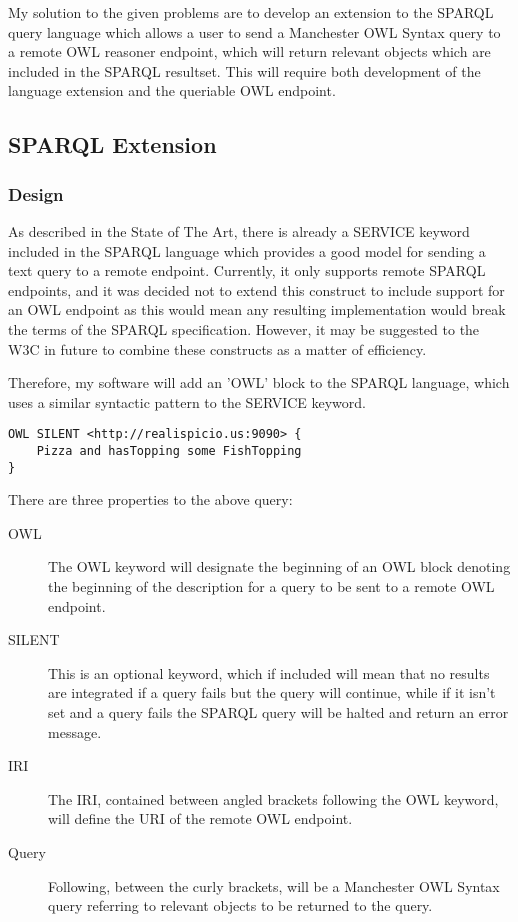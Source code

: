 \documentclass{article}
\begin{document}
My solution to the given problems are to develop an extension to the SPARQL
query language which allows a user to send a Manchester OWL Syntax query to a
remote OWL reasoner endpoint, which will return relevant objects which are
included in the SPARQL resultset. This will require both development of the
language extension and the queriable OWL endpoint.

\subsection{SPARQL Extension}

\subsubsection{Design}

As described in the State of The Art, there is already a SERVICE keyword
included in the SPARQL language which provides a good model for sending a text
query to a remote endpoint. Currently, it only supports remote SPARQL endpoints,
and it was decided not to extend this construct to include support for an OWL
endpoint as this would mean any resulting implementation would break the terms
of the SPARQL specification. However, it may be suggested to the W3C in future
to combine these constructs as a matter of efficiency. 

Therefore, my software will add an 'OWL' block to the SPARQL language, which
uses a similar syntactic pattern to the SERVICE keyword.

\begin{lstlisting}
OWL SILENT <http://realispicio.us:9090> {
    Pizza and hasTopping some FishTopping
}
\end{lstlisting}

There are three properties to the above query:

\begin{description}
    \item[OWL] The OWL keyword will designate the beginning of an OWL block
    denoting the beginning of the description for a query to be sent to a remote
    OWL endpoint.
    \item[SILENT] This is an optional keyword, which if included will mean that
    no results are integrated if a query fails but the query will continue,
    while if it isn't set and a query fails the SPARQL query will be halted and
    return an error message.
    \item[IRI] The IRI, contained between angled brackets following the OWL
    keyword, will define the URI of the remote OWL endpoint.
    \item[Query] Following, between the curly brackets, will be a Manchester OWL
    Syntax query referring to relevant objects to be returned to the query.
\end{description}
\end{document}
